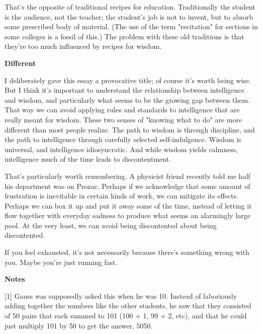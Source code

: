 That's
                  the opposite of traditional recipes for education.
                  Traditionally the student is the audience, not the teacher;
                  the student's job is not to invent, but to absorb some
                  prescribed body of material. (The use of the term "recitation"
                  for sections in some colleges is a fossil of this.) The
                  problem with these old traditions is that they're too much
                  influenced by recipes for wisdom.

\textbf{Different}

I deliberately gave this essay a provocative
                  title; of course it's worth being wise. But I think it's
                  important to understand the relationship between intelligence
                  and wisdom, and particularly what seems to be the growing gap
                  between them. That way we can avoid applying rules and
                  standards to intelligence that are really meant for wisdom.
                  These two senses of "knowing what to do" are more different
                  than most people realize. The path to wisdom is through
                  discipline, and the path to intelligence through carefully
                  selected self-indulgence. Wisdom is universal, and
                  intelligence idiosyncratic. And while wisdom yields calmness,
                  intelligence much of the time leads to discontentment.

That's
                  particularly worth remembering. A physicist friend recently
                  told me half his department was on Prozac. Perhaps if we
                  acknowledge that some amount of frustration is inevitable in
                  certain kinds of work, we can mitigate its effects. Perhaps we
                  can box it up and put it away some of the time, instead of
                  letting it flow together with everyday sadness to produce what
                  seems an alarmingly large pool. At the very least, we can
                  avoid being discontented about being discontented.

If
                  you feel exhausted, it's not necessarily because there's
                  something wrong with you. Maybe you're just running fast.





\textbf{Notes}

[1] Gauss was supposedly asked this when he was 10. Instead of
                  laboriously adding together the numbers like the other
                  students, he saw that they consisted of 50 pairs that each
                  summed to 101 (100 + 1, 99 + 2, etc), and that he could just
                  multiply 101 by 50 to get the answer, 5050.

